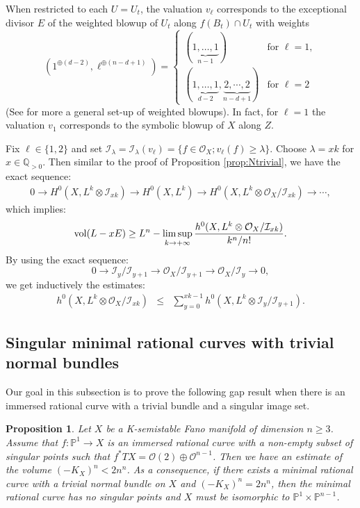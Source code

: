 \documentclass[12pt]{amsart}
\newtheorem{prop}[thm]{Proposition}
\theoremstyle{definition}
\def\limsup{{\rm lim\,sup}}
\def\vol{{\rm vol}}
\newcommand{\IP}{{\mathbb P}}
\newcommand{\IQ}{{\mathbb Q}}
\newcommand{\CI}{{\mathcal I}}
\newcommand{\CO}{{\mathcal O}}
\begin{document}
 When restricted to each $U=U_{t}$, the valuation $v_\ell$ corresponds to the exceptional divisor $E$ of the weighted blowup of $U_t$ along $f(B_t)\cap U_t$ with weights 
 \begin{equation*}
     (1^{\oplus (d-2)}, \ell^{\oplus (n-d+1)})=
     \left\{
     \begin{array}{ll}
     (\underbrace{1, \dots, 1}_{n-1})& \text{for } \ell=1, \\
     (\underbrace{1, \dots, 1}_{d-2}, \underbrace{2, \cdots, 2}_{n-d+1}) & \text{for } \ell=2
     \end{array}
     \right.
 \end{equation*}(See \cite{QR22} for more a general set-up of weighted blowups). In fact, for $\ell=1$ the valuation $v_1$ corresponds to the symbolic blowup of $X$ along $Z$.  

Fix $\ell\in \{1,2\}$ and set $\CI_{\lambda}=\CI_{\lambda}(v_\ell)=\{f\in \CO_X; v_\ell(f)\ge \lambda\}$. Choose $\lambda=x k$ for $x\in \IQ_{>0}$. Then similar to the proof of Proposition \ref{prop:Ntrivial}, we have the exact sequence:
\begin{eqnarray*}
    0\rightarrow H^0(X, L^k\otimes \CI_{xk})\rightarrow H^0(X, L^k)\rightarrow H^0({X}, L^k\otimes \CO_X/\CI_{xk})\rightarrow \cdots,
\end{eqnarray*}
which implies: 
$$\vol(L-xE)\ge L^n-\mathop{\limsup}_{k\rightarrow+\infty} \frac{h^0({X}, L^k\otimes \CO_X/\CI_{xk})}{k^n/n!}.$$
By using the exact sequence:
\begin{equation*}
    0\rightarrow \CI_y/\CI_{y+1}\rightarrow \CO_X/\CI_{y+1}\rightarrow \CO_X/\CI_y\rightarrow 0,
\end{equation*}
we get inductively the estimates:
\begin{eqnarray}\label{eq-tels2}
h^0(X, L^k\otimes \CO_X/\CI_{xk})%
&\le&\sum_{y=0}^{xk-1}h^0(X, L^k\otimes \CI_{y}/\CI_{y+1}).
\end{eqnarray}



\subsection{Singular minimal rational curves with trivial normal bundles}
Our goal in this subsection is to prove the following gap result when there is an immersed rational curve with a trivial bundle and a singular image set. 
\begin{prop}\label{prop-deg2}
    Let $X$ be a K-semistable Fano manifold of dimension $n\ge 3$. 
    Assume that $f: \IP^1\rightarrow X$ is an immersed rational curve with a non-empty subset of singular points such that $f^*TX=\CO(2)\oplus \CO^{n-1}$. Then we have an estimate of the volume $(-K_X)^n< 2n^n$.
    As a consequence, if there exists a minimal rational curve with a trivial normal bundle on $X$ and $(-K_X)^n=2n^n$, then the minimal rational curve has no singular points and $X$ must be isomorphic to $\IP^1\times \IP^{n-1}$.  
\end{prop}
\end{document}

